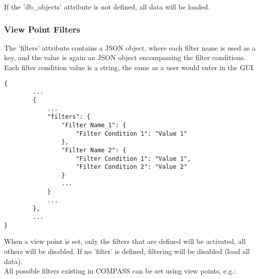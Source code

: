If the 'db\_objects' attribute is not defined, all data will be loaded.

\subsubsection{View Point Filters}

The 'filters' attribute contains a JSON object, where each filter name is used as a key, and the value is again an JSON object encompassing the filter conditions. Each filter condition value is a string, the same as a user would enter in the GUI.

\begin{lstlisting}[basicstyle=\small\ttfamily]
{
        ...
        {
            ...
            "filters": {
                "Filter Name 1": {
                    "Filter Condition 1": "Value 1"
                },
                "Filter Name 2": {
                    "Filter Condition 1": "Value 1",
                    "Filter Condition 2": "Value 2"
                }
                ...
            }
            ...
        },
        ...
}
\end{lstlisting}      

When a view point is set, only the filters that are defined will be activated, all others will be disabled. If no 'filter' is defined, filtering will be disabled (load all data). \\

All possible filters existing in COMPASS can be set using view points, e.g.:


